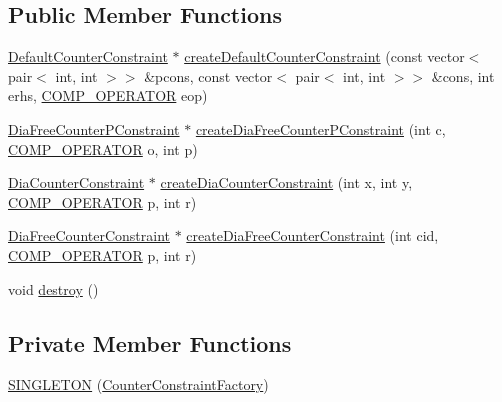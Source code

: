 \subsection*{Public Member Functions}
\begin{DoxyCompactItemize}
\item 
\mbox{\hyperlink{classgraphsat_1_1_default_counter_constraint}{Default\+Counter\+Constraint}} $\ast$ \mbox{\hyperlink{classgraphsat_1_1_counter_constraint_factory_ab9159fe75e5f66be295919d7e4e8424c}{create\+Default\+Counter\+Constraint}} (const vector$<$ pair$<$ int, int $>$$>$ \&pcons, const vector$<$ pair$<$ int, int $>$$>$ \&cons, int erhs, \mbox{\hyperlink{namespacegraphsat_acfb5939f9bdafbd9aea0d084b9a56f69}{C\+O\+M\+P\+\_\+\+O\+P\+E\+R\+A\+T\+OR}} eop)
\item 
\mbox{\hyperlink{classgraphsat_1_1_dia_free_counter_p_constraint}{Dia\+Free\+Counter\+P\+Constraint}} $\ast$ \mbox{\hyperlink{classgraphsat_1_1_counter_constraint_factory_a836f8b3c15398bb05721c05742713f69}{create\+Dia\+Free\+Counter\+P\+Constraint}} (int c, \mbox{\hyperlink{namespacegraphsat_acfb5939f9bdafbd9aea0d084b9a56f69}{C\+O\+M\+P\+\_\+\+O\+P\+E\+R\+A\+T\+OR}} o, int p)
\item 
\mbox{\hyperlink{classgraphsat_1_1_dia_counter_constraint}{Dia\+Counter\+Constraint}} $\ast$ \mbox{\hyperlink{classgraphsat_1_1_counter_constraint_factory_ade0ff0c1aca8de0e07be8fc7f0694996}{create\+Dia\+Counter\+Constraint}} (int x, int y, \mbox{\hyperlink{namespacegraphsat_acfb5939f9bdafbd9aea0d084b9a56f69}{C\+O\+M\+P\+\_\+\+O\+P\+E\+R\+A\+T\+OR}} p, int r)
\item 
\mbox{\hyperlink{classgraphsat_1_1_dia_free_counter_constraint}{Dia\+Free\+Counter\+Constraint}} $\ast$ \mbox{\hyperlink{classgraphsat_1_1_counter_constraint_factory_aca06d5896ce73cd048aadc97feea88f7}{create\+Dia\+Free\+Counter\+Constraint}} (int cid, \mbox{\hyperlink{namespacegraphsat_acfb5939f9bdafbd9aea0d084b9a56f69}{C\+O\+M\+P\+\_\+\+O\+P\+E\+R\+A\+T\+OR}} p, int r)
\item 
void \mbox{\hyperlink{classgraphsat_1_1_counter_constraint_factory_a7372d026e014236a543dce09909406de}{destroy}} ()
\end{DoxyCompactItemize}
\subsection*{Private Member Functions}
\begin{DoxyCompactItemize}
\item 
\mbox{\hyperlink{classgraphsat_1_1_counter_constraint_factory_a0138990409398673821c41dd2e468b43}{S\+I\+N\+G\+L\+E\+T\+ON}} (\mbox{\hyperlink{classgraphsat_1_1_counter_constraint_factory}{Counter\+Constraint\+Factory}})
\end{DoxyCompactItemize}
